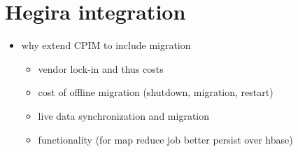 \section{Hegira integration}

\begin{itemize}
\item why extend CPIM to include migration
\begin{itemize}	
\item vendor lock-in and thus costs
\item cost of offline migration (shutdown, migration, restart)
\item live data synchronization and migration
\item functionality (for map reduce job better persist over hbase)
\end{itemize}
\end{itemize}



